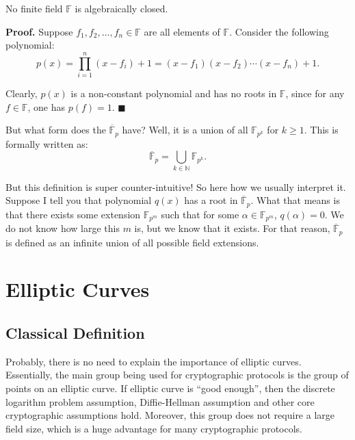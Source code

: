 \documentclass[../lecture-notes.tex]{subfiles}
\begin{document}
\begin{theorem}
    No finite field $\mathbb{F}$ is algebraically closed.
\end{theorem}

\textbf{Proof.} Suppose $f_1,f_2,\dots,f_n \in \mathbb{F}$ are all elements of $\mathbb{F}$. Consider the following polynomial:
\begin{equation}
    p(x) = \prod_{i=1}^n (x-f_i)+1 = (x-f_1)(x-f_2)\cdots(x-f_n)+1.
\end{equation}

Clearly, $p(x)$ is a non-constant polynomial and has no roots in $\mathbb{F}$, since for any $f \in \mathbb{F}$, one has $p(f)=1$. $\blacksquare$

But what form does the $\overline{\mathbb{F}}_{p}$ have? Well, it is a union of all $\mathbb{F}_{p^k}$ for $k \geq 1$. This is formally written as:
\begin{equation}
    \overline{\mathbb{F}}_{p} = \bigcup_{k \in \mathbb{N}} \mathbb{F}_{p^k}.
\end{equation} 

\begin{remark}
    But this definition is super counter-intuitive! So here how we usually interpret it. Suppose I tell you that polynomial $q(x)$ has a root in $\overline{\mathbb{F}}_p$. What that means is that there exists some extension $\mathbb{F}_{p^m}$ such that for some $\alpha \in \mathbb{F}_{p^m}$, $q(\alpha)=0$. We do not know how large this $m$ is, but we know that it exists. For that reason, $\overline{\mathbb{F}}_p$ is defined as an infinite union of all possible field extensions.
\end{remark}

\section{Elliptic Curves}

\subsection{Classical Definition}

Probably, there is no need to explain the importance of elliptic curves. Essentially, the main group being used for cryptographic 
protocols is the group of points on an elliptic curve. If elliptic curve is ``good enough'', then the discrete logarithm problem assumption,
Diffie-Hellman assumption and other core cryptographic assumptions hold. Moreover, this group does not require
a large field size, which is a huge advantage for many cryptographic protocols.
\end{document}
